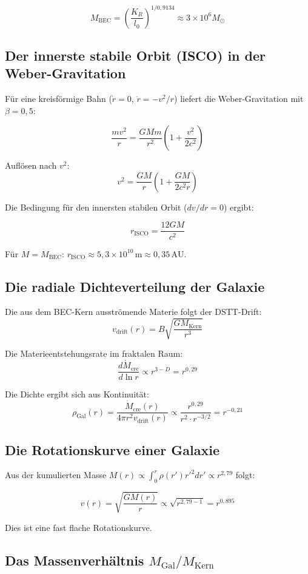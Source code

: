 \documentclass[12pt,a4paper]{article}
\begin{document}
\[
M_{\text{BEC}} = \left( \frac{K_R}{l_0} \right)^{1/0{,}9134} \approx 3 \times 10^6 M_\odot
\]

\subsection{Der innerste stabile Orbit (ISCO) in der Weber-Gravitation}

Für eine kreisförmige Bahn ($\dot{r}=0$, $\ddot{r} = -v^2/r$) liefert die Weber-Gravitation mit $\beta = 0{,}5$:

\[
\frac{mv^2}{r} = \frac{GMm}{r^2} \left( 1 + \frac{v^2}{2c^2} \right)
\]

Auflösen nach $v^2$:
\[
v^2 = \frac{GM}{r} \left( 1 + \frac{GM}{2c^2 r} \right)
\]

Die Bedingung für den innersten stabilen Orbit ($dv/dr = 0$) ergibt:

\[
r_{\text{ISCO}} = \frac{12GM}{c^2}
\]

Für $M = M_{\text{BEC}}$: $r_{\text{ISCO}} \approx 5{,}3 \times 10^{10}\,\text{m} \approx 0{,}35\,\text{AU}$.

\subsection{Die radiale Dichteverteilung der Galaxie}

Die aus dem BEC-Kern ausströmende Materie folgt der DSTT-Drift:
\[
v_{\text{drift}}(r) = B \sqrt{\frac{GM_{\text{Kern}}}{r^3}}
\]

Die Materieentstehungsrate im fraktalen Raum:
\[
\frac{d\dot{M}_{\text{cre}}}{d\ln r} \propto r^{3-D} = r^{0{,}29}
\]

Die Dichte ergibt sich aus Kontinuität:
\[
\rho_{\text{Gal}}(r) = \frac{\dot{M}_{\text{cre}}(r)}{4\pi r^2 v_{\text{drift}}(r)} \propto \frac{r^{0{,}29}}{r^2 \cdot r^{-3/2}} = r^{-0{,}21}
\]

\subsection{Die Rotationskurve einer Galaxie}

Aus der kumulierten Masse $M(r) \propto \int_0^r \rho(r') r'^2 dr' \propto r^{2{,}79}$ folgt:

\[
v(r) = \sqrt{\frac{GM(r)}{r}} \propto \sqrt{r^{2{,}79 - 1}} = r^{0{,}895}
\]

Dies ist eine fast flache Rotationskurve.

\subsection{Das Massenverhältnis $M_{\text{Gal}}/M_{\text{Kern}}$}
\end{document}
